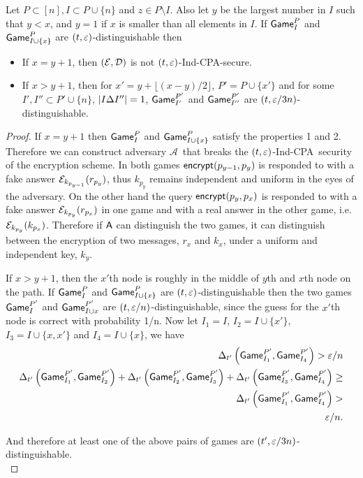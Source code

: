 \documentclass{article}
\newcommand{\tcpa}{$(t,\eps)$-Ind-CPA}
\def\A{{\sf A}}
\def\E{{\cal E}}
\def\D{{\cal D}}
\def\a {${\mathcal A}$}
\newcommand{\encrypt}{{\sf encrypt}}
\newcommand{\game}{{\sf Game}}
\newcommand{\dgg}[2]{\game_{#1}^{#2}}
\begin{document}
\begin{lemma}
Let $P\subset [n], I \subset P\cup \{n\}$ and $z\in P\setminus I$. Also let $y$ be the largest number in $I$ such that $y < x$, and $y=1$ if  $x$ is smaller than all elements in $I$. If $\dgg{I}{P}$ and $\dgg{I\cup \{x\}}{P}$ are $(t,\varepsilon)$-distinguishable then 

\begin{itemize}
\item If $x=y+1$, then $(\E,\D)$ is not \tcpa-secure.
\item If $x>y+1$, then for $x'=y+\lfloor{(x-y)/2}\rfloor$, $P'=P\cup \{x'\}$ and for some $I', I'' \subset P'\cup \{n\} $, $\left| I\Delta I'' \right| =1$, $\dgg{I'}{P'}$ and $\dgg{I''}{P'}$ are $(t, \varepsilon/3n)$-distinguishable.
\end{itemize}
\end{lemma}

\begin{proof}
If $x=y+1$ then $\dgg{I}{P}$ and $\dgg{I\cup \{x\}}{P}$ satisfy the properties 1 and 2. Therefore we can construct adversary \a~that breaks  the \tcpa~security of the encryption scheme. In both games $\encrypt(p_{y-1},p_{y})$ is responded to with a fake answer $\E_{k_{p_{y-1}}}(r_{p_{y}})$, thus $k_{p_{y}} $ remains independent and uniform in the eyes of the adversary. On the other hand the query $\encrypt(p_{y},p_x)$ is responded to with a fake answer $\E_{k_{p_{y}}}(r_{p_{x}})$ in one game and with a real answer in the other game, i.e. $\E_{k_{p_{y}}}(k_{p_{x}})$. Therefore if $\A$ can distinguish the two games, it can distinguish between the encryption of two messages, $r_x$ and $k_x$, under a uniform and independent key, $k_y$. 

If $x>y+1$, then the $x'$th node is roughly in the middle of $y$th and $x$th node on the path. If $\dgg{I}{P}$ and $\dgg{I\cup \{x\}}{P}$ are $(t,\varepsilon)$-distinguishable then the two games  $\dgg{I}{P'}$ and $\dgg{I\cup {x}}{P'}$ are $(t,\varepsilon/n)$-distinguishable, since the guess for the $x'$th node is correct with probability 1/n.
Now let $I_1=I$, $I_2=I\cup \{x'\}$, $I_3=I\cup \{x,x'\}$ and $I_4=I\cup \{x\}$, we have
\begin{align}
\dElta{\dgg{I_1}{P'}, \dgg{I_4}{P'}}  > \eps/n \\
\dElta{\dgg{I_1}{P'}, \dgg{I_2}{P'}} + \dElta{\dgg{I_2}{P'}, \dgg{I_3}{P'}} + \dElta{\dgg{I_3}{P'}, \dgg{I_4}{P'}}  \geq \nonumber\\ \dElta{\dgg{I_1}{P'}, \dgg{I_4}{P'}}  > \nonumber \\ \eps/n. \label{3.2} 
\end{align}

And therefore at least one of the above pairs of games are $(t',\varepsilon/3n)$-distinguishable. \\
\end{proof}
\end{document}
